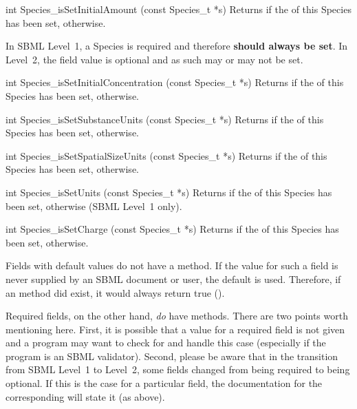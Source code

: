\documentclass{sbmlmanual}
\begin{document}
\begin{methoddef}{int Species\_isSetInitialAmount (const Species\_t *s)}
  Returns  if the  of this Species has been set,
   otherwise.
 
  In SBML Level~1, a Species  is required and
  therefore \textbf{should always be set}.  In Level~2, the
   field value is optional and as such may or may not
  be set.
\end{methoddef}


\begin{methoddef}{int Species\_isSetInitialConcentration (const Species\_t *s)}
  Returns  if the  of this Species has
  been set,  otherwise.
\end{methoddef}


\begin{methoddef}{int Species\_isSetSubstanceUnits (const Species\_t *s)}
  Returns  if the  of this Species has been set,
   otherwise.
\end{methoddef}


\begin{methoddef}{int Species\_isSetSpatialSizeUnits (const Species\_t *s)}
  Returns  if the  of this Species has been set,
   otherwise.
\end{methoddef}


\begin{methoddef}{int Species\_isSetUnits (const Species\_t *s)}
  Returns  if the  of this Species has been set, 
  otherwise (SBML Level~1 only).
\end{methoddef}


\begin{methoddef}{int Species\_isSetCharge (const Species\_t *s)}
  Returns  if the  of this Species has been set, 
  otherwise.
\end{methoddef}


Fields with default values do not have a  method.  If
the value for such a field is never supplied by an SBML document or user,
the default is used.  Therefore, if an  method did
exist, it would always return true ().

Required fields, on the other hand, \emph{do} have 
methods.  There are two points worth mentioning here.  First, it is
possible that a value for a required field is not given and a program may
want to check for and handle this case (especially if the program is an
SBML validator).  Second, please be aware that in the transition from SBML
Level~1 to Level~2, some fields changed from being required to being
optional.  If this is the case for a particular field, the documentation
for the corresponding  will state it (as above).
\end{document}
